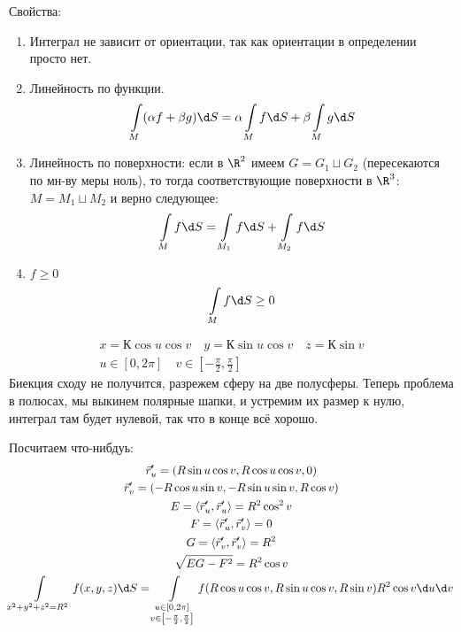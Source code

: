 Свойства:
\begin{enumerate}
\item
	Интеграл не зависит от ориентации, так как ориентации в определении просто нет.

\item
	Линейность по функции.
	\[ \int\limits_M (\alpha f + \beta g) \d S = \alpha \int\limits_M f \d S + \beta \int\limits_M g \d S \]

\item
	Линейность по поверхности: если в $\R^2$ имеем $G = G_1 \sqcup G_2$ (пересекаются по мн-ву меры ноль),
	то тогда соответствующие поверхности в $\R^3$: $M = M_1 \sqcup M_2$ и верно следующее:
	\[ \int\limits_M f \d S = \int\limits_{M_1} f \d S + \int\limits_{M_2} f \d S \]

\item
	$f \ge 0$
	\[ \int\limits_M f \d S \ge 0 \]
\end{enumerate}

\begin{exmp}
	\begin{gather*}
		x = К \cos u \cos v \quad y = К \sin u \cos v \quad z = К \sin v \\
		u \in [0, 2\pi] \quad v \in \left[-\frac\pi2,\frac\pi2\right]
	\end{gather*}
	Биекция сходу не получится, разрежем сферу на две полусферы.
	Теперь проблема в полюсах, мы выкинем полярные шапки, и устремим их размер к нулю, интеграл там будет нулевой, так что в конце всё хорошо.

	Посчитаем что-нибдуь:
	\begin{gather*}
		\vec r_u' = (R \sin u \cos v, R \cos u \cos v, 0) \\
		\vec r_v' = (-R \cos u \sin v, -R \sin u \sin v, R \cos v) \\
		E = \left<\vec r_u', \vec r_u'\right> = R^2 \cos^2 v \\
		F = \left<\vec r_u', \vec r_v'\right> = 0 \\
		G = \left<\vec r_v', \vec r_v'\right> = R^2 \\
		\sqrt{EG-F^2} = R^2 \cos v \\
		\int\limits_{x^2+y^2+z^2=R^2} f(x, y, z) \d S
		= \int\limits_{\substack{u \in [0, 2\pi] \\ v \in \left[-\frac\pi2,\frac\pi2\right]}} f(R \cos u \cos v, R \sin u \cos v, R \sin v) R^2 \cos v \d u \d v
	\end{gather*}
\end{exmp}

